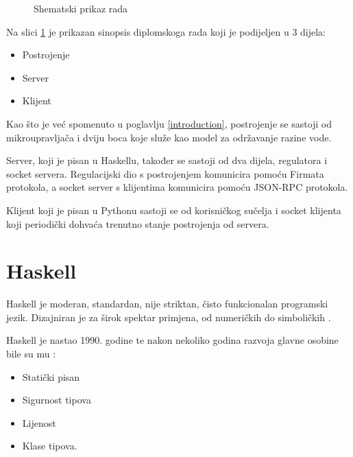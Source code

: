 \begin{figure}[H]
\caption{Shematski prikaz rada}
\label{fig:main_sheme}
\end{figure}

Na slici \ref{fig:main_sheme} je prikazan sinopsis diplomskoga rada koji je podijeljen u 3 dijela:
\begin{itemize}
        \item Postrojenje
        \item Server
        \item Klijent
\end{itemize}

Kao što je već spomenuto u poglavlju \ref{introduction}, postrojenje se sastoji
od mikroupravljača i dviju boca koje služe kao model za održavanje razine vode.

Server, koji je pisan u Haskellu, također se sastoji od dva dijela, regulatora i
socket servera. Regulacijski dio s postrojenjem komunicira pomoću Firmata
protokola, a socket server s klijentima komunicira pomoću JSON-RPC protokola.

Klijent koji je pisan u Pythonu sastoji se od korisničkog sučelja i socket
klijenta koji periodički dohvaća trenutno stanje postrojenja od servera.

\section{Haskell}

Haskell je moderan, standardan, nije striktan, čisto funkcionalan programski
jezik. Dizajniran je za širok spektar primjena, od numeričkih do
simboličkih \cite{haskell_intro}.

Haskell je nastao 1990. godine te nakon nekoliko godina razvoja glavne osobine
bile su mu \cite{haskell_history}:

\begin{itemize}
\item Statički pisan
\item Sigurnost tipova
\item Lijenost
\item Klase tipova.
\end{itemize}

